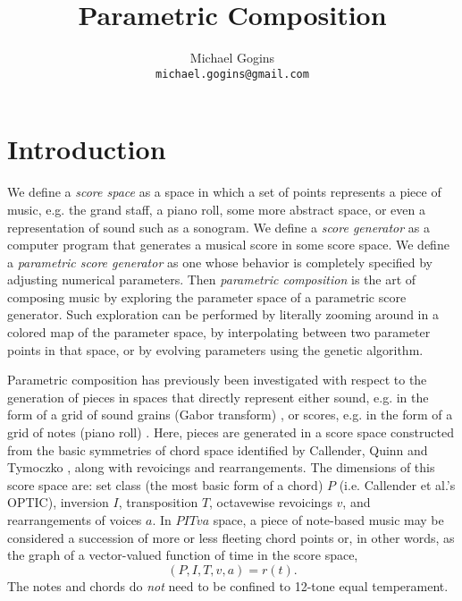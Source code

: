 \documentclass[english,11pt,letterpaper,onecolumn]{scrartcl}
\begin{document}
\title{Parametric Composition}
\author{Michael Gogins \\ \texttt{michael.gogins@gmail.com}}
\maketitle


\section{Introduction}

We define a \textit{score space} as a space in which a set of points represents 
a piece of music, e.g. the grand staff, a piano roll, some more abstract 
space, or even a representation of sound such as a sonogram. We define a 
\textit{score generator} as a computer program that generates a musical score 
in some score space. We define a \textit{parametric score generator} as one 
whose behavior is completely specified by adjusting numerical parameters. Then 
\textit{parametric composition} is the art of composing music by exploring the 
parameter space of a parametric score generator. Such exploration can be 
performed by literally zooming around in a colored map of the parameter space, 
by interpolating between two parameter points in that space, or by evolving 
parameters using the genetic algorithm. 

Parametric composition has previously been investigated with respect to 
the generation of pieces in spaces that directly represent either sound, 
e.g. in the form of a grid of sound grains (Gabor transform) \cite{obsessed}, 
or scores, e.g. in the form of a grid of notes (piano roll) \cite{ifsmusic}. 
Here, pieces are generated in a score space constructed from the basic 
symmetries of chord space identified by Callender, 
Quinn and Tymoczko \cite{callender:346}, along with revoicings and 
rearrangements. The dimensions of this score space are: set class 
(the most basic form of a chord) $P$ (i.e. Callender et al.'s OPTIC), 
inversion $I$, transposition $T$, octavewise revoicings $v$, and 
rearrangements of voices $a$. In $PITva$ space, a piece of note-based music may 
be considered a succession of more or less fleeting chord points or, in other 
words, as the graph of a vector-valued function of time in the score space, 
$$(P, I, T, v, a) = r(t).$$ The notes and chords do \textit{not} need to be 
confined to 12-tone 
equal temperament.
\end{document}
